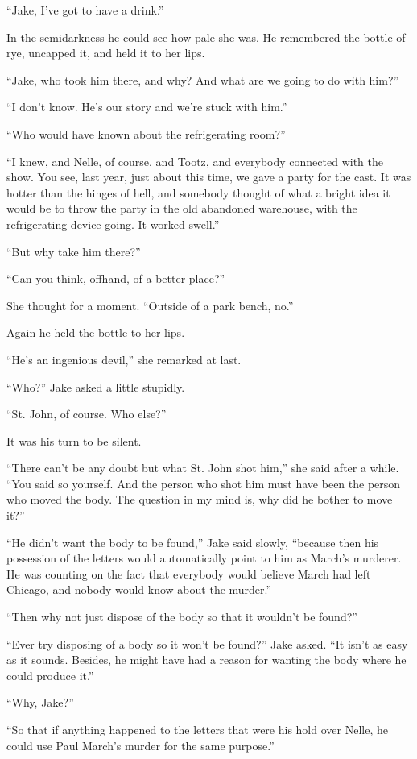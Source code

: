 \documentclass{novel}
\begin{document}
“Jake, I've got to have a drink.”

In the semidarkness he could see how pale she was. He remembered the bottle of rye, uncapped it, and held it to her lips.

“Jake, who took him there, and why? And what are we going to do with him?”

“I don’t know. He’s our story and we’re stuck with him.”

“Who would have known about the refrigerating room?”

“I knew, and Nelle, of course, and Tootz, and everybody connected with the show. You see, last year, just about this time, we gave a party for the cast. It was hotter than the hinges of hell, and somebody thought of what a bright idea it would be to throw the party in the old abandoned warehouse, with the refrigerating device going. It worked swell.”

“But why take him there?”

“Can you think, offhand, of a better place?”

She thought for a moment. “Outside of a park bench, no.”

Again he held the bottle to her lips.

“He’s an ingenious devil,” she remarked at last.

“Who?” Jake asked a little stupidly.

“St. John, of course. Who else?”

It was his turn to be silent.

“There can’t be any doubt but what St. John shot him,” she said after a while. “You said so yourself. And the person who shot him must have been the person who moved the body. The question in my mind is, why did he bother to move it?”

“He didn’t want the body to be found,” Jake said slowly, “because then his possession of the letters would automatically point to him as March’s murderer. He was counting on the fact that everybody would believe March had left Chicago, and nobody would know about the murder.”

“Then why not just dispose of the body so that it wouldn’t be found?”

“Ever try disposing of a body so it won’t be found?” Jake asked. “It isn’t as easy as it sounds. Besides, he might have had a reason for wanting the body where he could produce it.”

“Why, Jake?”

“So that if anything happened to the letters that were his hold over Nelle, he could use Paul March’s murder for the same purpose.”
\end{document}
